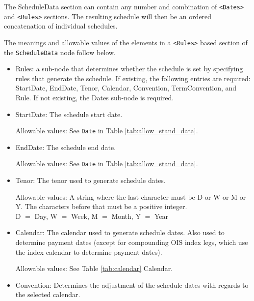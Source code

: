 The ScheduleData section can contain any number and combination of
{\tt <Dates>} and {\tt <Rules>} sections. The resulting schedule will
then be an ordered concatenation of individual schedules.
 
\medskip
The meanings and allowable values of the elements in a {\tt <Rules>} based section of the  \lstinline!ScheduleData! node follow below.

\begin{itemize}
\item Rules: a sub-node that determines whether the schedule is set by specifying rules that
generate the schedule. If existing, the following entries are required: StartDate, EndDate, Tenor, Calendar, 
Convention, TermConvention, and Rule. If not existing, the Dates
sub-node is required.
\item StartDate:  The schedule start date.  

Allowable values:  See \lstinline!Date! in Table \ref{tab:allow_stand_data}.

\item EndDate: The schedule end date.  

Allowable values:  See \lstinline!Date! in Table \ref{tab:allow_stand_data}.

\item Tenor: The tenor used to generate schedule dates. 

Allowable values: A string where the last character must be D or W or
M or Y.  The characters before that must be a positive integer. \\D
$=$ Day, W $=$ Week, M $=$ Month, Y $=$ Year

\item Calendar: The calendar used to generate schedule  dates. Also used to determine payment dates (except for compounding OIS index legs, which use the index calendar to determine payment dates).

Allowable values: See Table \ref{tab:calendar} Calendar.

\item Convention: Determines the adjustment of the schedule dates with
  regards to the selected calendar. 


\end{itemize}
